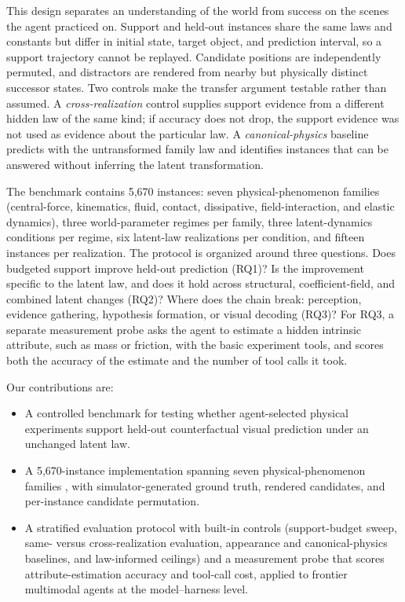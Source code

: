 This design separates an understanding of the world from success on the scenes the agent practiced on. Support and held-out instances share the same laws and constants but differ in initial state, target object, and prediction interval, so a support trajectory cannot be replayed. Candidate positions are independently permuted, and distractors are rendered from nearby but physically distinct successor states. Two controls make the transfer argument testable rather than assumed. A \emph{cross-realization} control supplies support evidence from a different hidden law of the same kind; if accuracy does not drop, the support evidence was not used as evidence about the particular law. A \emph{canonical-physics} baseline predicts with the untransformed family law and identifies instances that can be answered without inferring the latent transformation.

The benchmark contains 5,670 instances: seven physical-phenomenon families (central-force, kinematics, fluid, contact, dissipative, field-interaction, and elastic dynamics), three world-parameter regimes per family, three latent-dynamics conditions per regime, six latent-law realizations per condition, and fifteen instances per realization. The protocol is organized around three questions. Does budgeted support improve held-out prediction (RQ1)? Is the improvement specific to the latent law, and does it hold across structural, coefficient-field, and combined latent changes (RQ2)? Where does the chain break: perception, evidence gathering, hypothesis formation, or visual decoding (RQ3)? For RQ3, a separate measurement probe asks the agent to estimate a hidden intrinsic attribute, such as mass or friction, with the basic experiment tools, and scores both the accuracy of the estimate and the number of tool calls it took.

Our contributions are:
\begin{itemize}
  \item A controlled benchmark for testing whether agent-selected physical experiments support held-out counterfactual visual prediction under an unchanged latent law.
  \item A 5,670-instance implementation spanning seven physical-phenomenon families , with simulator-generated ground truth, rendered candidates, and per-instance candidate permutation.
  \item A stratified evaluation protocol with built-in controls (support-budget sweep, same- versus cross-realization evaluation, appearance and canonical-physics baselines, and law-informed ceilings) and a measurement probe that scores attribute-estimation accuracy and tool-call cost, applied to frontier multimodal agents at the model--harness level. 
\end{itemize}

